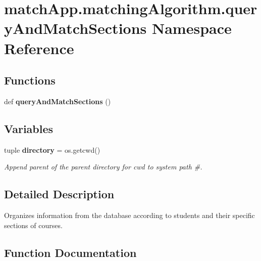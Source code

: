 \section{match\+App.\+matching\+Algorithm.\+query\+And\+Match\+Sections Namespace Reference}
\label{namespacematch_app_1_1matching_algorithm_1_1query_and_match_sections}
\subsection*{Functions}
\begin{DoxyCompactItemize}
\item 
def {\bf query\+And\+Match\+Sections} ()
\end{DoxyCompactItemize}
\subsection*{Variables}
\begin{DoxyCompactItemize}
\item 
tuple {\bf directory} = os.\+getcwd()
\begin{DoxyCompactList}\small\item\em Append parent of the parent directory for cwd to system path \#. \end{DoxyCompactList}\end{DoxyCompactItemize}


\subsection{Detailed Description}
\begin{DoxyVerb}Organizes information from the database according to students and their specific sections of courses.\end{DoxyVerb}
 

\subsection{Function Documentation}
